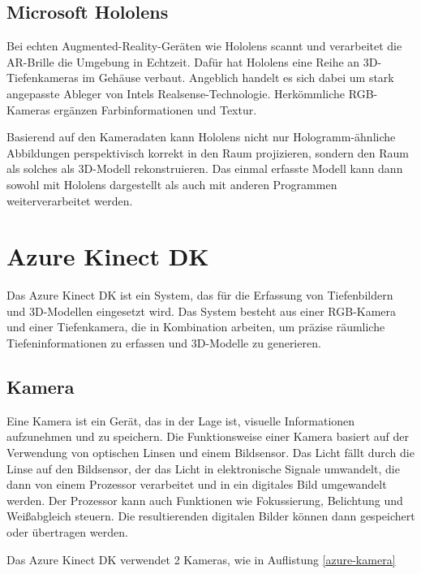 \subsection{Microsoft Hololens}
Bei echten Augmented-Reality-Geräten wie Hololens scannt und verarbeitet die AR-Brille die Umgebung in Echtzeit. Dafür hat Hololens eine Reihe an 3D-Tiefenkameras im Gehäuse verbaut. Angeblich handelt es sich dabei um stark angepasste Ableger von Intels Realsense-Technologie. Herkömmliche RGB-Kameras ergänzen Farbinformationen und Textur.

Basierend auf den Kameradaten kann Hololens nicht nur Hologramm-ähnliche Abbildungen perspektivisch korrekt in den Raum projizieren, sondern den Raum als solches als 3D-Modell rekonstruieren. Das einmal erfasste Modell kann dann sowohl mit Hololens dargestellt als auch mit anderen Programmen weiterverarbeitet werden.

\section{Azure Kinect DK}

Das Azure Kinect DK ist ein System, das für die Erfassung von Tiefenbildern und 3D-Modellen eingesetzt wird. Das System besteht aus einer RGB-Kamera und einer Tiefenkamera, die in Kombination arbeiten, um präzise räumliche Tiefeninformationen zu erfassen und 3D-Modelle zu generieren.

\subsection{Kamera} \label{kamera:section}
Eine Kamera ist ein Gerät, das in der Lage ist, visuelle Informationen aufzunehmen und zu speichern. Die Funktionsweise einer Kamera basiert auf der Verwendung von optischen Linsen und einem Bildsensor. Das Licht fällt durch die Linse auf den Bildsensor, der das Licht in elektronische Signale umwandelt, die dann von einem Prozessor verarbeitet und in ein digitales Bild umgewandelt werden. Der Prozessor kann auch Funktionen wie Fokussierung, Belichtung und Weißabgleich steuern. Die resultierenden digitalen Bilder können dann gespeichert oder übertragen werden. 

Das Azure Kinect \ac{DK} verwendet 2 Kameras, wie in Auflistung \ref{azure-kamera}

